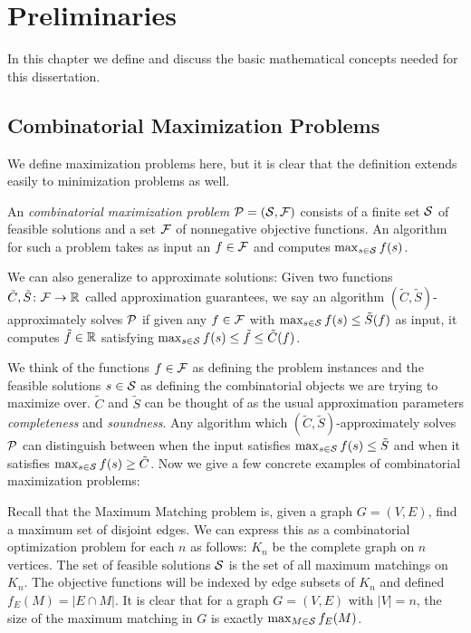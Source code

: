 \chapter{Preliminaries}
In this chapter we define and discuss the basic mathematical concepts needed for this dissertation.
\section{Combinatorial Maximization Problems}
We define maximization problems here, but it is clear that the definition extends easily to minimization problems as well.
\begin{definition}
An \emph{combinatorial maximization problem} \(\mathcal P = (\mathcal S, \mathcal F)\)
consists of a finite set
\(\mathcal S\) of feasible solutions and a set \(\mathcal F\) of nonnegative
objective functions. An algorithm for such a problem takes as input an $f \in \mathcal F$ and computes
$\max_{s \in \mathcal S} f(s)$.


We can also generalize to approximate solutions: Given two functions \(\tilde{C}, \tilde{S} \colon \mathcal F \rightarrow \mathbb R\)
called approximation guarantees, we say
an algorithm \((\tilde{C}, \tilde{S})\)-approximately solves \(\mathcal P\)
if given any \(f \in \mathcal F\) with \(\max_{s \in \mathcal S} f(s) \leq \tilde{S}(f)\) as input,
it computes \(\tilde{f}\in \mathbb R\) satisfying
\(\max_{s \in \mathcal S} f(s) \leq \tilde{f} \leq \tilde{C}(f)\).
\end{definition}
We think of the functions $f \in \mathcal F$ as defining the problem instances and the feasible solutions $s \in \mathcal S$ as defining the combinatorial objects we are 
trying to maximize over. $\tilde{C}$ and $\tilde{S}$ can be thought of as the usual approximation parameters \emph{completeness} and \emph{soundness}. Any
algorithm which $(\tilde{C},\tilde{S})$-approximately solves $\mathcal P$ can distinguish between when the input satisfies $\max_{s\in \mathcal S} f(s) \leq \tilde{S}$ and when it satisfies $\max_{s \in\mathcal S} f(s) \geq \tilde{C}$. Now we give a few concrete examples of combinatorial maximization problems:
\begin{example}
Recall that the Maximum Matching problem is, given a graph $G = (V,E)$, find a maximum set of disjoint edges. We can express this as a combinatorial optimization problem for each $n$ as follows: $K_n$ be the complete graph on $n$ vertices. The set of feasible solutions $\mathcal S$ is the set of all maximum matchings on $K_n$. The objective functions will be indexed by edge subsets of $K_n$ and defined $f_E(M) = |E \cap M|$. It is clear that for a graph $G = (V, E)$ with $|V| = n$, the size of the maximum matching in $G$ is exactly $\max_{M \in \mathcal S} f_E(M)$.
\end{example}
